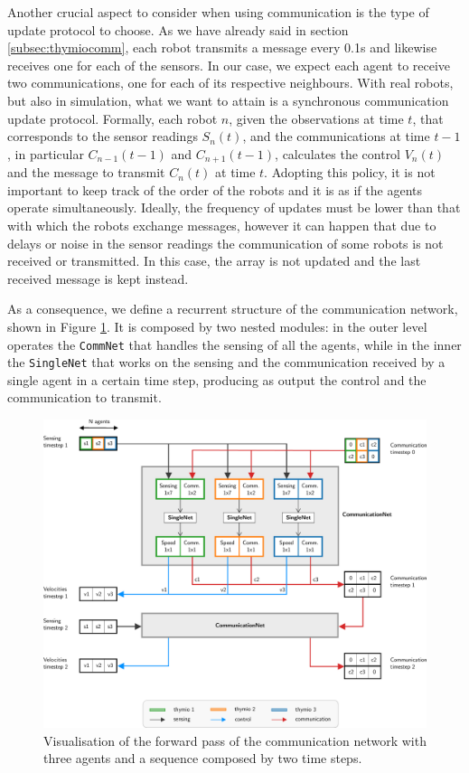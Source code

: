 Another crucial aspect to consider when using communication is the type of   
update protocol to choose. As we have already said in section 
\ref{subsec:thymiocomm}, each robot transmits a message every 0.1\gls{s} 
and likewise receives one for each of the sensors. In our case, we expect 
each agent to receive two communications, one for each of its respective 
neighbours. 
With real robots, but also in simulation, what we want to attain is a 
synchronous communication update protocol. Formally, each robot $n$, 
given the observations at time $t$, that corresponds to the sensor readings 
$S_n(t)$, and the communications at time $t-1$, in particular $C_{n-1}(t-1)$ 
and $C_{n+1}(t-1)$, calculates the control $V_n(t)$ and the message to 
transmit $C_n(t)$ at time $t$. 
Adopting this policy, it is not important to keep track of the order of the 
robots and it is as if the agents operate simultaneously. 
Ideally, the frequency of updates must be lower than that with which the 
robots exchange messages, however it can happen that due to delays or 
noise in the sensor readings the communication of some robots is not 
received or transmitted. In this case, the array is not updated and the last 
received message is kept instead. 

As a consequence, we define a recurrent structure of the communication 
network, shown in Figure \ref{fig:commnet1}. It is composed by two nested 
modules: in the outer level operates the \texttt{CommNet} that handles the 
sensing of all the agents, while in the inner the \texttt{SingleNet} that 
works on the sensing and the communication received by a single agent in a 
certain time step, producing as output the control and the communication to 
transmit. 
\begin{figure}[!htb]
	\centering
	\includegraphics[width=\textwidth]{contents/images/commnet2}
	\caption[Communication network.]{Visualisation of the forward pass of the 
		communication network with three agents and a sequence composed by two 
		time steps.}
	\label{fig:commnet1}
\end{figure}

